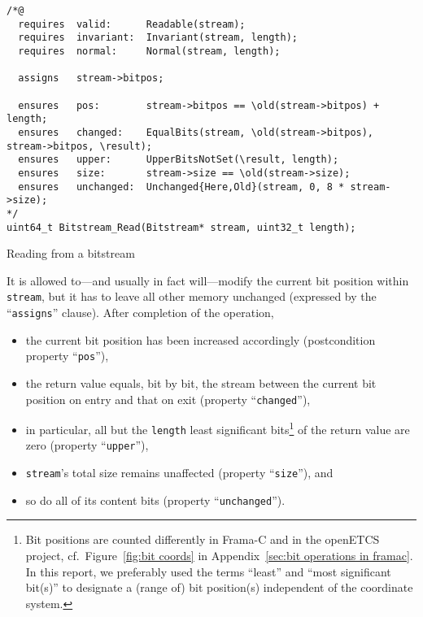 \begin{listing}[hbt]
\begin{minipage}{0.99\textwidth}
\begin{lstlisting}[style=acsl-block]
/*@
  requires  valid:      Readable(stream);
  requires  invariant:  Invariant(stream, length);
  requires  normal:     Normal(stream, length);

  assigns   stream->bitpos;

  ensures   pos:        stream->bitpos == \old(stream->bitpos) + length;
  ensures   changed:    EqualBits(stream, \old(stream->bitpos), stream->bitpos, \result);
  ensures   upper:      UpperBitsNotSet(\result, length);
  ensures   size:       stream->size == \old(stream->size);
  ensures   unchanged:  Unchanged{Here,Old}(stream, 0, 8 * stream->size);
*/
uint64_t Bitstream_Read(Bitstream* stream, uint32_t length);
\end{lstlisting}
\end{minipage}
\caption{\label{lst:Bitstream_Read spec}Reading from a bitstream}
\end{listing}

\FloatBarrier

It is allowed to---and usually in fact will---modify the current bit
position within \lstinline{stream}, but it has to leave all other memory
unchanged (expressed by the ``\lstinline{assigns}'' clause).
%
After completion of the operation, 
%
\begin{itemize}
\item the current bit position has been increased accordingly
	(postcondition property ``\lstinline{pos}''),
\item the return value equals, bit by bit, the stream between the
	current bit position on entry and that on exit
	(property ``\lstinline{changed}''),
\item in particular, all but the \lstinline{length} least significant
	bits\footnote{
		Bit positions are counted differently in Frama-C and in
		the openETCS project, cf.\
		Figure~\ref{fig:bit coords} 
		in Appendix~\ref{sec:bit operations in framac}.
		In this report, we preferably used the terms ``least''
		and ``most significant bit(s)'' to
		designate a (range of) bit position(s) independent of
		the coordinate system.
	}
	of the return value are zero
	(property ``\lstinline{upper}''),
\item \lstinline{stream}'s total size remains unaffected
	(property ``\lstinline{size}''), and
\item so do all of its content bits
	(property ``\lstinline{unchanged}'').
\end{itemize}




